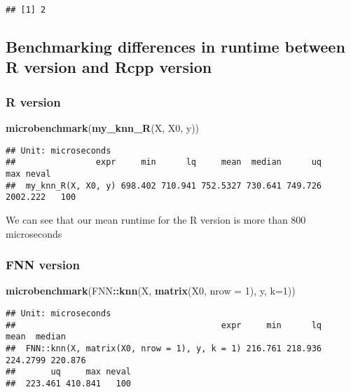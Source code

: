 \documentclass[]{article}
\newenvironment{Shaded}{\begin{snugshade}}{\end{snugshade}}
\newcommand{\DataTypeTok}[1]{\textcolor[rgb]{0.13,0.29,0.53}{#1}}
\newcommand{\DecValTok}[1]{\textcolor[rgb]{0.00,0.00,0.81}{#1}}
\newcommand{\KeywordTok}[1]{\textcolor[rgb]{0.13,0.29,0.53}{\textbf{#1}}}
\newcommand{\NormalTok}[1]{#1}
\newcommand{\OperatorTok}[1]{\textcolor[rgb]{0.81,0.36,0.00}{\textbf{#1}}}
\begin{document}
\begin{verbatim}
## [1] 2
\end{verbatim}

\hypertarget{benchmarking-differences-in-runtime-between-r-version-and-rcpp-version}{%
\subsection{Benchmarking differences in runtime between R version and
Rcpp
version}\label{benchmarking-differences-in-runtime-between-r-version-and-rcpp-version}}

\hypertarget{r-version}{%
\subsubsection{R version}\label{r-version}}

\begin{Shaded}
\begin{Highlighting}[]
\KeywordTok{microbenchmark}\NormalTok{(}\KeywordTok{my_knn_R}\NormalTok{(X, X0, y))}
\end{Highlighting}
\end{Shaded}

\begin{verbatim}
## Unit: microseconds
##                expr     min      lq     mean  median      uq      max neval
##  my_knn_R(X, X0, y) 698.402 710.941 752.5327 730.641 749.726 2002.222   100
\end{verbatim}

We can see that our mean runtime for the R version is more than 800
microseconds

\hypertarget{fnn-version}{%
\subsubsection{FNN version}\label{fnn-version}}

\begin{Shaded}
\begin{Highlighting}[]
\KeywordTok{microbenchmark}\NormalTok{(FNN}\OperatorTok{::}\KeywordTok{knn}\NormalTok{(X, }\KeywordTok{matrix}\NormalTok{(X0, }\DataTypeTok{nrow =} \DecValTok{1}\NormalTok{), y, }\DataTypeTok{k=}\DecValTok{1}\NormalTok{))}
\end{Highlighting}
\end{Shaded}

\begin{verbatim}
## Unit: microseconds
##                                         expr     min      lq     mean  median
##  FNN::knn(X, matrix(X0, nrow = 1), y, k = 1) 216.761 218.936 224.2799 220.876
##       uq     max neval
##  223.461 410.841   100
\end{verbatim}
\end{document}
